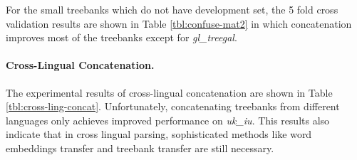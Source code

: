 \documentclass[11pt,a4paper]{article}
\begin{document}
For the small treebanks which do not have development set,
the 5 fold cross validation results are shown in Table \ref{tbl:confuse-mat2}
in which concatenation improves most of the treebanks except for \textit{gl\_treegal}.

\paragraph{Cross-Lingual Concatenation.}

The experimental results of cross-lingual concatenation are shown in Table \ref{tbl:cross-ling-concat}.
Unfortunately, concatenating treebanks from different languages only
achieves improved performance on \textit{uk\_iu}.
This results also indicate that in cross lingual parsing,
sophisticated methods like word embeddings transfer \cite{guo-EtAl:2015:ACL-IJCNLP2,guo2016representation} and treebank transfer \cite{C16-1002}
are still necessary.
\end{document}

